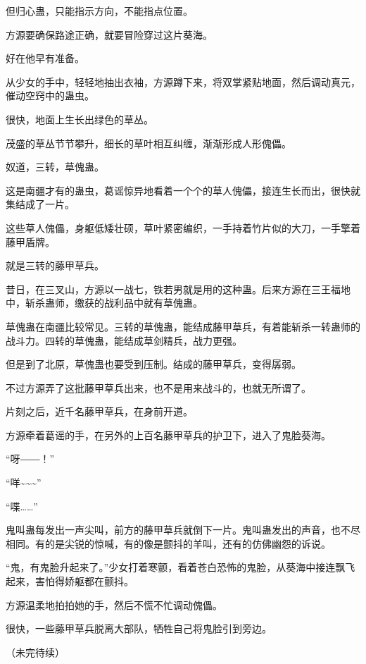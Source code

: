 \begin{this_body}
但归心蛊，只能指示方向，不能指点位置。

方源要确保路途正确，就要冒险穿过这片葵海。

好在他早有准备。

从少女的手中，轻轻地抽出衣袖，方源蹲下来，将双掌紧贴地面，然后调动真元，催动空窍中的蛊虫。

很快，地面上生长出绿色的草丛。

茂盛的草丛节节攀升，细长的草叶相互纠缠，渐渐形成人形傀儡。

奴道，三转，草傀蛊。

这是南疆才有的蛊虫，葛谣惊异地看着一个个的草人傀儡，接连生长而出，很快就集结成了一片。

这些草人傀儡，身躯低矮壮硕，草叶紧密编织，一手持着竹片似的大刀，一手擎着藤甲盾牌。

就是三转的藤甲草兵。

昔日，在三叉山，方源以一战七，铁若男就是用的这种蛊。后来方源在三王福地中，斩杀蛊师，缴获的战利品中就有草傀蛊。

草傀蛊在南疆比较常见。三转的草傀蛊，能结成藤甲草兵，有着能斩杀一转蛊师的战斗力。四转的草傀蛊，能结成草剑精兵，战力更强。

但是到了北原，草傀蛊也要受到压制。结成的藤甲草兵，变得孱弱。

不过方源弄了这批藤甲草兵出来，也不是用来战斗的，也就无所谓了。

片刻之后，近千名藤甲草兵，在身前开道。

方源牵着葛谣的手，在另外的上百名藤甲草兵的护卫下，进入了鬼脸葵海。

“呀――！”

“咩\~{}\~{}\~{}”

“喋……”

鬼叫蛊每发出一声尖叫，前方的藤甲草兵就倒下一片。鬼叫蛊发出的声音，也不尽相同。有的是尖锐的惊喊，有的像是颤抖的羊叫，还有的仿佛幽怨的诉说。

“鬼，有鬼脸升起来了。”少女打着寒颤，看着苍白恐怖的鬼脸，从葵海中接连飘飞起来，害怕得娇躯都在颤抖。

方源温柔地拍拍她的手，然后不慌不忙调动傀儡。

很快，一些藤甲草兵脱离大部队，牺牲自己将鬼脸引到旁边。

（未完待续）

\end{this_body}

